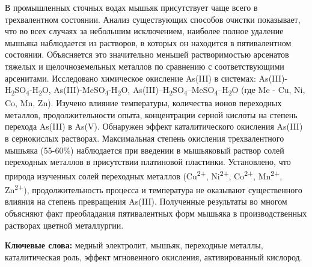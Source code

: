 В промышленных сточных водах мышьяк присутствует чаще всего в
трехвалентном состоянии. Анализ существующих способов очистки
показывает, что во всех случаях за небольшим исключением, наиболее
полное удаление мышьяка наблюдается из растворов, в которых он находится
в пятивалентном состоянии. Объясняется это значительно меньшей
растворимостью арсенатов тяжелых и щелочноземельных металлов по
сравнению с соответствующими арсенитами. Исследовано химическое
окисление As(III) в системах:
As(III)-H\textsubscript{2}SO\textsubscript{4}-H\textsubscript{2}O,
As(III)-MeSO\textsubscript{4}-H\textsubscript{2}O,
As(III)--H\textsubscript{2}SO\textsubscript{4}--MeSO\textsubscript{4}--H\textsubscript{2}O
(где Me - Cu, Ni, Co, Mn, Zn). Изучено влияние температуры, количества
ионов переходных металлов, продолжительности опыта, концентрации серной
кислоты на степень перехода As(III) в As(V). Обнаружен эффект
каталитического окисления As(III) в сернокислых растворах. Максимальная
степень окисления трехвалентного мышьяка (55-60\%) наблюдается при
введении в мышьяковый раствор солей переходных металлов в присутствии
платиновой пластинки. Установлено, что природа изученных солей
переходных металлов (Cu\textsuperscript{2+}, Ni\textsuperscript{2+},
Co\textsuperscript{2+}, Mn\textsuperscript{2+}, Zn\textsuperscript{2+}),
продолжительность процесса и температура не оказывают существенного
влияния на степень превращения As(III). Полученные результаты во многом
объясняют факт преобладания пятивалентных форм мышьяка в
производственных растворах цветной металлургии.

{\bfseries Ключевые слова:} медный электролит, мышьяк, переходные металлы,
каталитическая роль, эффект мгновенного окисления, активированный
кислород.

